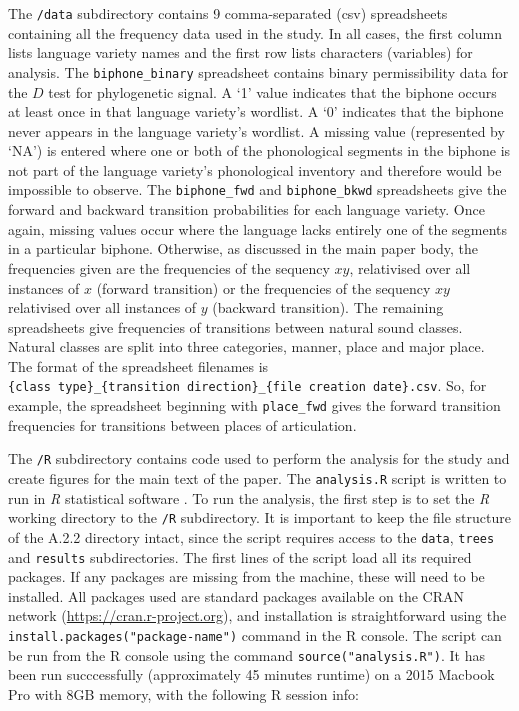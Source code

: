 The \texttt{/data} subdirectory contains 9 comma-separated (csv)
spreadsheets containing all the frequency data used in the study. In all
cases, the first column lists language variety names and the first row
lists characters (variables) for analysis. The \texttt{biphone\_binary}
spreadsheet contains binary permissibility data for the \(D\) test for
phylogenetic signal. A `1' value indicates that the biphone occurs at
least once in that language variety's wordlist. A `0' indicates that the
biphone never appears in the language variety's wordlist. A missing
value (represented by `NA') is entered where one or both of the
phonological segments in the biphone is not part of the language
variety's phonological inventory and therefore would be impossible to
observe. The \texttt{biphone\_fwd} and \texttt{biphone\_bkwd}
spreadsheets give the forward and backward transition probabilities for
each language variety. Once again, missing values occur where the
language lacks entirely one of the segments in a particular biphone.
Otherwise, as discussed in the main paper body, the frequencies given
are the frequencies of the sequency \(xy\), relativised over all
instances of \(x\) (forward transition) or the frequencies of the
sequency \(xy\) relativised over all instances of \(y\) (backward
transition). The remaining spreadsheets give frequencies of transitions
between natural sound classes. Natural classes are split into three
categories, manner, place and major place. The format of the spreadsheet
filenames is
\texttt{\{class\ type\}\_\{transition\ direction\}\_\{file\ creation\ date\}.csv}.
So, for example, the spreadsheet beginning with \texttt{place\_fwd}
gives the forward transition frequencies for transitions between places
of articulation.

The \texttt{/R} subdirectory contains code used to perform the analysis
for the study and create figures for the main text of the paper. The
\texttt{analysis.R} script is written to run in \emph{R} statistical
software \autocite{r_core_team_r_2017}. To run the analysis, the first
step is to set the \emph{R} working directory to the \texttt{/R}
subdirectory. It is important to keep the file structure of the A.2.2
directory intact, since the script requires access to the \texttt{data},
\texttt{trees} and \texttt{results} subdirectories. The first lines of
the script load all its required packages. If any packages are missing
from the machine, these will need to be installed. All packages used are
standard packages available on the CRAN network
(\url{https://cran.r-project.org}), and installation is straightforward
using the \texttt{install.packages("package-name")} command in the R
console. The script can be run from the R console using the command
\texttt{source("analysis.R")}. It has been run succcessfully
(approximately 45 minutes runtime) on a 2015 Macbook Pro with 8GB
memory, with the following R session info:

